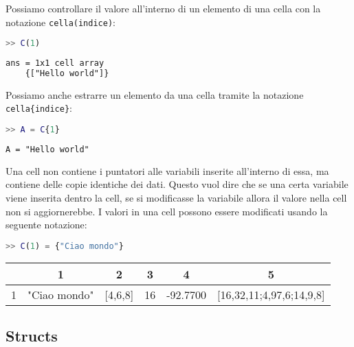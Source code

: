 Possiamo controllare il valore all'interno di un elemento di una cella con la notazione \texttt{cella(indice)}:

\begin{terminal}
    \begin{lstlisting}[language=MATLAB, style=notexterm]
>> C(1)\end{lstlisting}
    \tcblower
    \begin{lstlisting}[style=notexterm, language = tex]
ans = 1x1 cell array
    {["Hello world"]}\end{lstlisting}
\end{terminal}

Possiamo anche estrarre un elemento da una cella tramite la notazione \texttt{cella\{indice\}}:

\begin{terminal}
    \begin{lstlisting}[language=MATLAB, style=notexterm]
>> A = C{1}\end{lstlisting}
    \tcblower
    \begin{lstlisting}[style=notexterm, language = tex]
A = "Hello world"\end{lstlisting}
\end{terminal}

Una cell non contiene i puntatori alle variabili inserite all'interno di essa, ma contiene delle copie identiche dei dati. Questo vuol dire che se una certa variabile viene inserita dentro la cell, se si modificasse la variabile allora il valore nella cell non si aggiornerebbe. I valori in una cell possono essere modificati usando la seguente notazione:

\begin{terminal}
    \begin{lstlisting}[language=MATLAB, style=notexterm]
>> C(1) = {"Ciao mondo"}\end{lstlisting}
    \tcblower
    {
        \color{white} \ttfamily
        \begin{tabular} {|c|c|c|c|c|c|}
        \hline
         & 1 & 2 & 3 & 4 & 5 \\
        \hline
        1 & "Ciao mondo" & [4,6,8] & 16 & -92.7700 & [16,32,11;4,97,6;14,9,8] \\ 
        \hline
        \end{tabular}
    }
\end{terminal}

\subsection{Structs}

